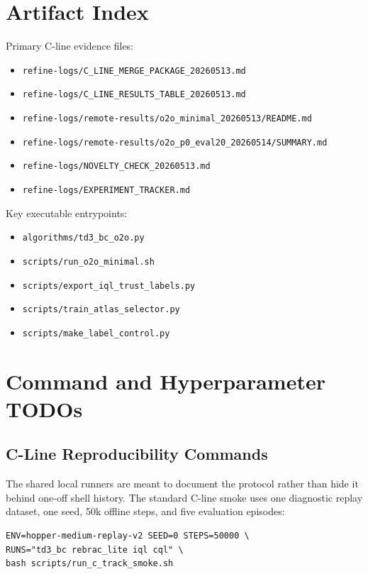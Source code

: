\section{Artifact Index}

Primary C-line evidence files:

\begin{itemize}[leftmargin=*]
  \item \texttt{refine-logs/C\_LINE\_MERGE\_PACKAGE\_20260513.md}
  \item \texttt{refine-logs/C\_LINE\_RESULTS\_TABLE\_20260513.md}
  \item \texttt{refine-logs/remote-results/o2o\_minimal\_20260513/README.md}
  \item \texttt{refine-logs/remote-results/o2o\_p0\_eval20\_20260514/SUMMARY.md}
  \item \texttt{refine-logs/NOVELTY\_CHECK\_20260513.md}
  \item \texttt{refine-logs/EXPERIMENT\_TRACKER.md}
\end{itemize}

Key executable entrypoints:

\begin{itemize}[leftmargin=*]
  \item \texttt{algorithms/td3\_bc\_o2o.py}
  \item \texttt{scripts/run\_o2o\_minimal.sh}
  \item \texttt{scripts/export\_iql\_trust\_labels.py}
  \item \texttt{scripts/train\_atlas\_selector.py}
  \item \texttt{scripts/make\_label\_control.py}
\end{itemize}

\section{Command and Hyperparameter TODOs}

\subsection{C-Line Reproducibility Commands}

The shared local runners are meant to document the protocol rather than hide it behind one-off shell history. The standard C-line smoke uses one diagnostic replay dataset, one seed, 50k offline steps, and five evaluation episodes:

\begin{verbatim}
ENV=hopper-medium-replay-v2 SEED=0 STEPS=50000 \
RUNS="td3_bc rebrac_lite iql cql" \
bash scripts/run_c_track_smoke.sh
\end{verbatim}

